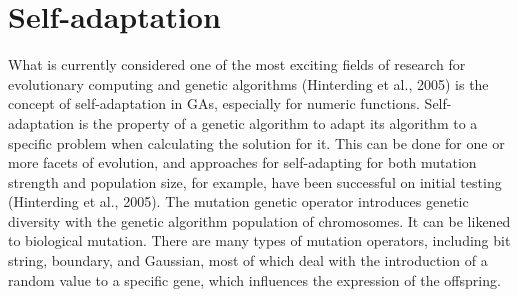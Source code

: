 \documentclass{JMLFS}
\begin{document}
\section{{ Self-adaptation}}
What is currently considered one of the most exciting fields of research for evolutionary computing and genetic algorithms (Hinterding et al., 2005) is the concept of self-adaptation in GAs, especially for numeric functions. Self-adaptation is the property of a genetic algorithm to adapt its algorithm to a specific problem when calculating the solution for it. This can be done for one or more facets of evolution, and approaches for self-adapting for both mutation strength and population size, for example, have been successful on initial testing (Hinterding et al., 2005). The mutation genetic operator introduces genetic diversity with the genetic algorithm population of chromosomes. It can be likened to biological mutation. There are many types of mutation operators, including bit string, boundary, and Gaussian, most of which deal with the introduction of a random value to a specific gene, which influences the expression of the offspring.
\end{document}
